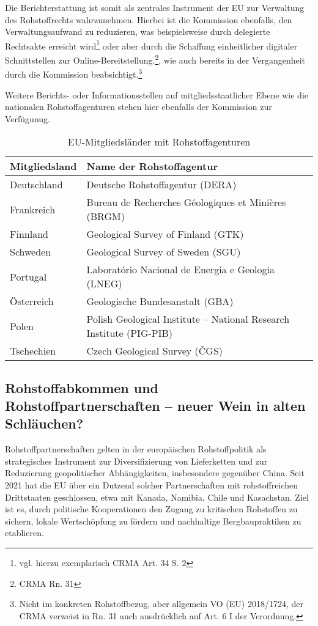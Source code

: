 \documentclass[12pt,a4paper,oneside]{book} %
\begin{document}
Die Berichterstattung ist somit als zentrales Instrument der EU zur Verwaltung des Rohstoffrechts wahrzunehmen. Hierbei ist die Kommission ebenfalls, den Verwaltungsaufwand zu reduzieren, was beispielsweise durch delegierte Rechtsakte erreicht wird\footnote{vgl. hierzu exemplarisch CRMA Art. 34 S. 2} oder aber durch die Schaffung einheitlicher digitaler Schnittstellen zur Online-Bereitstellung.\footnote{CRMA Rn. 31}, wie auch bereits in der Vergangenheit durch die Kommission beabsichtigt.\footnote{Nicht im konkreten Rohstoffbezug, aber allgemein VO (EU) 2018/1724, der CRMA verweist in Rn. 31 auch ausdrücklich auf Art. 6 I der Verordnung.}

Weitere Berichts- oder Informationsstellen auf mitgliedsstaatlicher Ebene wie die nationalen Rohstoffagenturen stehen hier ebenfalls der Kommission zur Verfügunug.
\begin{table}[h!]
	\centering
	\begin{tabular}{|l|l|}
		\hline
		\textbf{Mitgliedsland} & \textbf{Name der Rohstoffagentur} \\ \hline
		Deutschland            & Deutsche Rohstoffagentur (DERA) \\ \hline
		Frankreich             & Bureau de Recherches Géologiques et Minières (BRGM) \\ \hline
		Finnland               & Geological Survey of Finland (GTK) \\ \hline
		Schweden               & Geological Survey of Sweden (SGU) \\ \hline
		Portugal               & Laboratório Nacional de Energia e Geologia (LNEG) \\ \hline
		Österreich             & Geologische Bundesanstalt (GBA) \\ \hline
		Polen                  & Polish Geological Institute – National Research Institute (PIG-PIB) \\ \hline
		Tschechien             & Czech Geological Survey (ČGS) \\ \hline
	\end{tabular}
	\caption{EU-Mitgliedsländer mit Rohstoffagenturen}
	\label{tab:rohstoffagenturen}
\end{table}







\subsection{Rohstoffabkommen und Rohstoffpartnerschaften -- neuer Wein in alten Schläuchen?}
Rohstoffpartnerschaften gelten in der europäischen Rohstoffpolitik als strategisches Instrument zur Diversifizierung von Lieferketten und zur Reduzierung geopolitischer Abhängigkeiten, insbesondere gegenüber China. Seit 2021 hat die EU über ein Dutzend solcher Partnerschaften mit rohstoffreichen Drittstaaten geschlossen, etwa mit Kanada, Namibia, Chile und Kasachstan. Ziel ist es, durch politische Kooperationen den Zugang zu kritischen Rohstoffen zu sichern, lokale Wertschöpfung zu fördern und nachhaltige Bergbaupraktiken zu etablieren.
\end{document}
